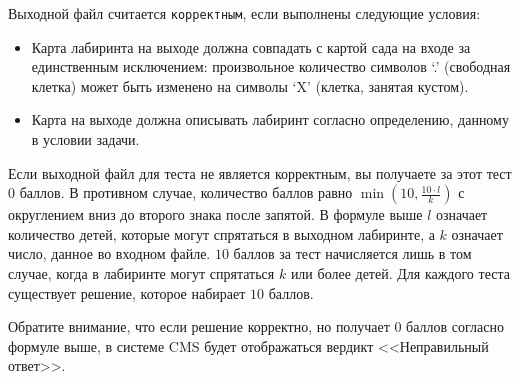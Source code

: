 Выходной файл считается \texttt{корректным}, если выполнены следующие условия:
\begin{itemize}
\item Карта лабиринта на выходе должна совпадать с картой сада на входе за единственным
исключением: произвольное количество символов `.' (свободная клетка) может быть
изменено на символы `X' (клетка, занятая кустом).
\item Карта на выходе должна описывать лабиринт согласно определению, данному в условии
задачи.
\end{itemize}

Если выходной файл для теста не является корректным, вы получаете за этот тест $0$ баллов.
В противном случае, количество баллов равно $\min(10, \frac{10 \cdot l}{k})$ с округлением вниз до второго знака после запятой. В формуле выше $l$ означает количество детей, которые могут спрятаться в выходном лабиринте, а $k$ означает число, данное во входном файле. $10$ баллов за тест начисляется лишь в том случае, когда в лабиринте могут спрятаться $k$ или более детей. Для каждого теста существует решение, которое набирает $10$ баллов.

Обратите внимание, что если решение корректно, но получает $0$ баллов согласно формуле
выше, в системе CMS будет отображаться вердикт <<Неправильный ответ>>.